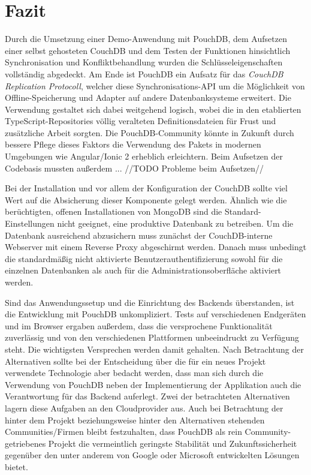 \chapter{Fazit}
\label{Fazit}
Durch die Umsetzung einer Demo-Anwendung mit PouchDB, dem Aufsetzen einer selbst gehosteten CouchDB und dem Testen der Funktionen hinsichtlich Synchronisation und Konfliktbehandlung wurden die Schlüsseleigenschaften vollständig abgedeckt. Am Ende ist PouchDB ein Aufsatz für das \emph{CouchDB Replication Protocoll}, welcher diese Synchronisations-API um die Möglichkeit von Offline-Speicherung und Adapter auf andere Datenbanksysteme erweitert. Die Verwendung gestaltet sich dabei weitgehend logisch, wobei die in den etablierten TypeScript-Repositories völlig veralteten Definitionsdateien für Frust und zusätzliche Arbeit sorgten. Die PouchDB-Community könnte in Zukunft durch bessere Pflege dieses Faktors die Verwendung des Pakets in modernen Umgebungen wie Angular/Ionic 2 erheblich erleichtern. Beim Aufsetzen der Codebasis mussten außerdem ... //TODO Probleme beim Aufsetzen//

Bei der Installation und vor allem der Konfiguration der CouchDB sollte viel Wert auf die Absicherung dieser Komponente gelegt werden. Ähnlich wie die berüchtigten, offenen Installationen von MongoDB sind die Standard-Einstellungen nicht geeignet, eine produktive Datenbank zu betreiben. Um die Datenbank ausreichend abzusichern muss zunächst der CouchDB-interne Webserver mit einem Reverse Proxy abgeschirmt werden. Danach muss unbedingt die standardmäßig nicht aktivierte Benutzerauthentifizierung sowohl für die einzelnen Datenbanken als auch für die Administrationsoberfläche aktiviert werden.

Sind das Anwendungssetup und die Einrichtung des Backends überstanden, ist die Entwicklung mit PouchDB unkompliziert. Tests auf verschiedenen Endgeräten und im Browser ergaben außerdem, dass die versprochene Funktionalität zuverlässig und von den verschiedenen Plattformen unbeeindruckt zu Verfügung steht. Die wichtigsten Versprechen werden damit gehalten.
Nach Betrachtung der Alternativen sollte bei der Entscheidung über die für ein neues Projekt verwendete Technologie aber bedacht werden, dass man sich durch die Verwendung von PouchDB neben der Implementierung der Applikation auch die Verantwortung für das Backend auferlegt. Zwei der betrachteten Alternativen lagern diese Aufgaben an den Cloudprovider aus. Auch bei Betrachtung der hinter dem Projekt beziehungsweise hinter den Alternativen stehenden Communities/Firmen bleibt festzuhalten, dass PouchDB als rein Community-getriebenes Projekt die vermeintlich geringste Stabilität und Zukunftssicherheit gegenüber den unter anderem von Google oder Microsoft entwickelten Lösungen bietet.
